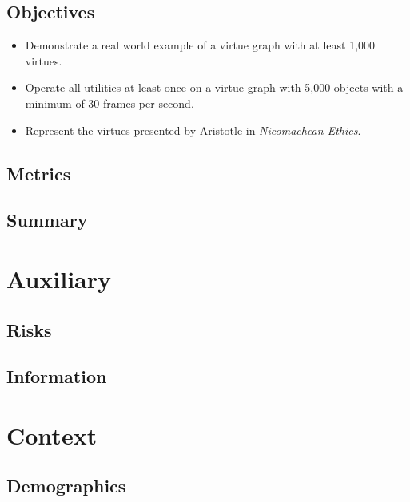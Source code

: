 \documentclass{article}
\begin{document}
\subsection{Objectives}

\begin{itemize}
    \item Demonstrate a real world example of a virtue graph with at least 1,000 virtues.
    \item Operate all utilities at least once on a virtue graph with 5,000 objects with a minimum of 30 frames per second.
    \item Represent the virtues presented by Aristotle in \textit{Nicomachean Ethics}.
\end{itemize}

\subsection{Metrics}


\subsection{Summary}


\section{Auxiliary}

\subsection{Risks}


\subsection{Information}


\section{Context}

\subsection{Demographics}
\end{document}

